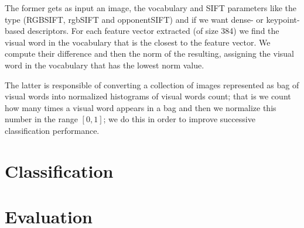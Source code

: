 \documentclass[11pt]{article}
\begin{document}
The former gets as input an image, the vocabulary and SIFT parameters like the
type (RGBSIFT, rgbSIFT and opponentSIFT) and if we want dense- or keypoint-based
descriptors. For each feature vector extracted (of size 384) we find the visual
word in the vocabulary that is the closest to the feature vector. We compute
their difference and then the norm of the resulting, assigning the visual word
in the vocabulary that has the lowest norm value.

The latter is responsible of converting a collection of images represented as
bag of visual words into normalized histograms of visual words count; that is we
count how many times a visual word appears in a bag and then we normalize this
number in the range $[0, 1]$; we do this in order to improve successive
classification performance.


\section{Classification}



\section{Evaluation}
\end{document}

